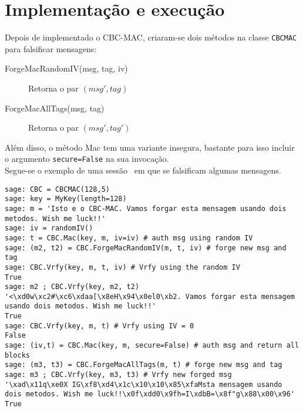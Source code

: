 \section{Implementação e execução \sage}
Depois de implementado o CBC-MAC, criaram-se dois métodos na classe \verb|CBCMAC| para falsificar mensagens:
\begin{description}
  \item[ForgeMacRandomIV(msg, tag, iv)] Retorna o par $(msg', tag)$
  \item[ForgeMacAllTags(msg, tag)] Retorna o par $(msg', tag')$
\end{description}
Além disso, o método \textsf{Mac} tem uma variante insegura, bastante para isso incluir o argumento \verb|secure=False| na sua invocação.\\
Segue-se o exemplo de uma sessão \sage\ em que se falsificam algumas mensagens.
\begin{lstlisting}[style=Bash,caption=Exemplo de falsificação de MACs em \sage]
sage: CBC = CBCMAC(128,5)
sage: key = MyKey(length=128)
sage: m = 'Isto e o CBC-MAC. Vamos forgar esta mensagem usando dois metodos. Wish me luck!!'
sage: iv = randomIV()
sage: t = CBC.Mac(key, m, iv=iv) # auth msg using random IV
sage: (m2, t2) = CBC.ForgeMacRandomIV(m, t, iv) # forge new msg and tag
sage: CBC.Vrfy(key, m, t, iv) # Vrfy using the random IV
True
sage: m2 ; CBC.Vrfy(key, m2, t2)
'<\xd0w\xc2#\xc6\xdaa[\x8eH\x94\x0el0\xb2. Vamos forgar esta mensagem usando dois metodos. Wish me luck!!'
True
sage: CBC.Vrfy(key, m, t) # Vrfy using IV = 0
False
sage: (iv,t) = CBC.Mac(key, m, secure=False) # auth msg and return all blocks
sage: (m3, t3) = CBC.ForgeMacAllTags(m, t) # forge new msg and tag
sage: m3 ; CBC.Vrfy(key, m3, t3) # Vrfy new forged msg
'\xad\x11q\xe0X IG\xf8\xd4\x1c\x10\x10\x85\xfaMsta mensagem usando dois metodos. Wish me luck!!\x0f\xdd0\x9fh=I\xdbB=\x8f"g\x88\x00\x96'
True
\end{lstlisting}
